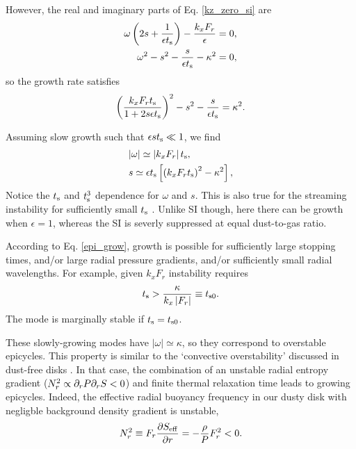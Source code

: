 However, the real and imaginary parts of Eq. \ref{kz_zero_si}  are
\begin{align}
\omega\left(2 s + \frac{1}{\epsilon t_\mathrm{s}}\right) - \frac{k_xF_r}{\epsilon} & =
                                                                     0, \label{epi_overs1} \\
\omega^2 - s^2 - \frac{s}{\epsilon t_\mathrm{s}}  - \kappa^2 &= 0, \label{epi_overs2}
\end{align}
so the growth rate satisfies 
\begin{align*}
\left( \frac{k_xF_r\tstop}{1 + 2 s\epsilon\tstop}\right)^2 - s^2
  - \frac{s}{\epsilon \tstop} = \kappa^2. %
\end{align*}

Assuming slow growth such that $\epsilon s t_\mathrm{s} \ll 1$, we find 
\begin{align}
  &|\omega| \simeq \left|k_xF_r\right| t_\mathrm{s}, \\
  &s \simeq \epsilon t_\mathrm{s} \left[\left(k_xF_rt_\mathrm{s}\right)^2 - \kappa^2\right],\label{epi_grow}
\end{align}
Notice the $t_\mathrm{s}$ and $t_\mathrm{s}^3$ dependence for 
$\omega$ and $s$. This is also true for the streaming 
instability for sufficiently small $t_\mathrm{s}$ \citep{jacquet11}. Unlike
SI though, here there can be growth when $\epsilon=1$, whereas the SI
is severly suppressed at equal dust-to-gas ratio.  


According to Eq. \ref{epi_grow}, growth is possible for sufficiently
large stopping times, and/or large radial pressure gradients, and/or
sufficiently small radial wavelengths. For example, given $k_xF_r$
instability requires 
\begin{align}
t_\mathrm{s} > \frac{\kappa}{k_x\left|F_r\right|}\equiv t_{\mathrm{s}0}.\label{epi_grow_criterion}
\end{align}
The mode is marginally stable if $t_\mathrm{s} = t_{\mathrm{s}0}$. 

These slowly-growing modes have $|\omega|\simeq \kappa$, so they correspond to
overstable epicycles. This property is similar to the `convective 
overstability' discussed in dust-free disks 
\citep{klahr14,lyra14,latter16}. In that case, the combination of an 
unstable radial entropy gradient ($N_r^2  \propto \partial_rP\partial_rS < 0 $) and
finite thermal relaxation time leads to growing epicycles. Indeed, the
effective radial buoyancy frequency in our dusty disk 
with negligble background density gradient is unstable, 
\begin{align}
  N_r^2 \equiv F_r\frac{\partial S_\mathrm{eff}}{\partial r} =
  -\frac{\rho}{P}F_r^2<0.  
\end{align}


